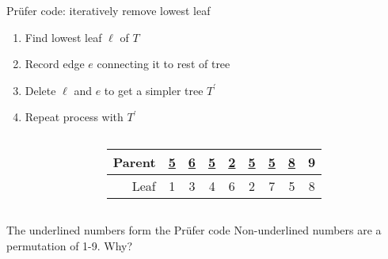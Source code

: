 \documentclass{beamer}
\begin{document}
\begin{frame}{Pr\"ufer code: iteratively remove lowest leaf}
  \begin{enumerate}
\item Find lowest leaf $\ell$ of $T$
\item Record edge $e$ connecting it to rest of tree
\item Delete $\ell$ and $e$ to get a simpler tree $T^\prime$
\item Repeat process with $T^\prime$
  \end{enumerate}
   \begin{columns}
      \begin{column}{.3\textwidth}
\begin{center}
\end{center}      
      \end{column}
      \begin{column}{.7\textwidth}
\begin{center}
        \begin{tabular}{r|c|c|c|c|c|c|c|c}

        Parent & \underline{5} & \underline{6} & \underline{5} & \underline{2} & \underline{5} & \underline{5} & \underline{8} & 9 \\ \hline
        Leaf   & 1 & 3 & 4 & 6 & 2 & 7 & 5 & 8 
        \end{tabular}
\end{center}
\end{column}
    \end{columns}
   \begin{block}{The underlined numbers form the Pr\"ufer code}
Non-underlined numbers are a permutation of 1-9.  Why?
   \end{block}

  \end{frame}
\end{document}
